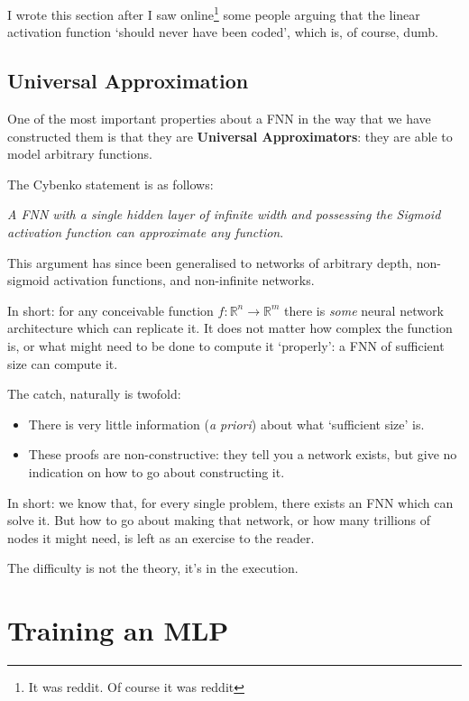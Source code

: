 \documentclass[a4paper,openany,11pt]{book}
\begin{document}
					I wrote this section after I saw online\footnote{It was reddit. Of course it was reddit} some people arguing that the linear activation function `should never have been coded', which is, of course, dumb.


			\section{Universal Approximation}

				One of the most important properties about a FNN in the way that we have constructed them is that they are \textbf{Universal Approximators}: they are able to model arbitrary functions.

				The Cybenko statement is as follows:

				{\centering \it A FNN with a single hidden layer of infinite width and possessing the Sigmoid activation function can approximate any function}.

				This argument has since been generalised to networks of arbitrary depth, non-sigmoid activation functions, and non-infinite networks. 

				In short: for any conceivable function $f: \mathbb{R}^n \to \mathbb{R}^m$ there is \textit{some} neural network architecture which can replicate it. It does not matter how complex the function is, or what might need to be done to compute it `properly': a FNN of sufficient size can compute it.

				The catch, naturally is twofold:
				\begin{itemize}
					\item There is very little information (\textit{a priori}) about what `sufficient size' is.
					\item These proofs are non-constructive: they tell you a network exists, but give no indication on how to go about constructing it.
				\end{itemize}

				In short: we know that, for every single problem, there exists an FNN which can solve it. But how to go about making that network, or how many trillions of nodes it might need, is left as an exercise to the reader. 

				The difficulty is not the theory, it's in the execution.

				
				

		\chapter{Training an MLP}
\end{document}
